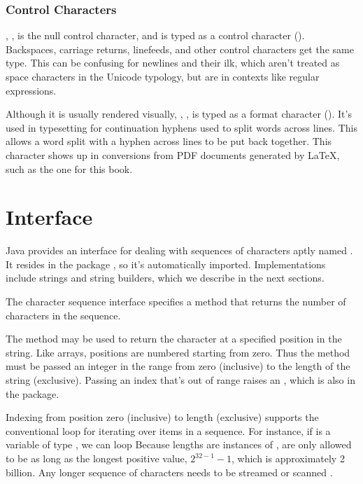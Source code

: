 \subsubsection{Control Characters}

, , is the null control
character, and is typed as a control character ().
Backspaces, carriage returns, linefeeds, and other control characters
get the same type.  This can be confusing for newlines and their ilk,
which aren't treated as space characters in the Unicode typology, but
are in contexts like regular expressions.

Although it is usually rendered visually, ,
, is typed as a format character ().
It's used in typesetting for continuation hyphens used to split words
across lines.  This allows a word split with a hyphen across lines to
be put back together.  This character shows up in conversions from PDF
documents generated by \LaTeX, such as the one for this book.



\section{ Interface}

Java provides an interface for dealing with sequences of characters
aptly named .  It resides in the package
, so it's automatically imported.  Implementations
include strings and string builders, which we describe in the next
sections.

The character sequence interface specifies a method 
that returns the number of characters in the sequence.  

The method  may be used to return the character at a
specified position in the string.  Like arrays, positions are numbered
starting from zero.  Thus the method must be passed an integer in the
range from zero (inclusive) to the length of the string (exclusive).
Passing an index that's out of range raises an
, which is also in the
 package.

Indexing from position zero (inclusive) to length (exclusive) supports
the conventional  loop for iterating over items in a sequence.
For instance, if  is a variable of type ,
we can loop
%
%
Because lengths are instances of , are only allowed to be as
long as the longest positive  value, $2^{32-1} - 1$, which
is approximately 2 billion.  Any longer sequence of characters needs
to be streamed  or scanned
.

